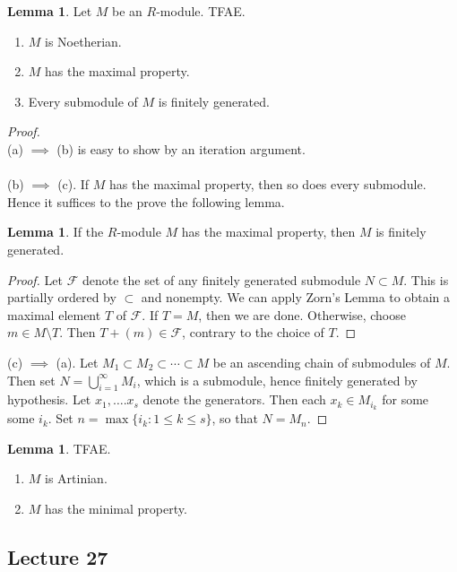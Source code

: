 \documentclass[10pt,letterpaper,cm]{nupset}
\theoremstyle{definition}
\theoremstyle{theorem}
\newtheorem{lemma}[definition]{Lemma}
\theoremstyle{remark}
\newcommand{\1}{\mathbf{1}}
\newcommand{\0}{\vec 0}
\begin{document}
\begin{lemma} Let $M$ be an $R$-module. TFAE.
\begin{enumerate}[label=(\alph*)]
\item $M$ is Noetherian.
\item $M$ has the maximal property. 
\item Every submodule of $M$ is finitely generated. 
\end{enumerate}
\end{lemma}
\begin{proof} $ $ \\
(a) $\implies$ (b) is easy to show by an iteration argument.
\\ \\ (b) $\implies$ (c). If $M$ has the maximal property, then so does every submodule. Hence it suffices to the prove the following lemma.
\begin{lemma}\label{l19}
If the $R$-module $M$ has the maximal property, then $M$ is finitely generated.
\end{lemma}
\begin{proof}
Let $\mathcal{F}$ denote the set of any finitely generated submodule $N\subset M$. This is partially ordered by $\subset$ and nonempty. We can apply Zorn's Lemma to obtain a maximal element $T$ of $\mathcal{F}$. If $T=M$, then we are done. Otherwise, choose $m\in M \setminus T$. Then $T + (m) \in \mathcal{F}$, contrary to the choice of $T$. 
\end{proof}
(c) $\implies$ (a). Let $M_1 \subset M_2 \subset \cdots \subset M$ be an ascending chain of submodules of $M$. Then set $N= \bigcup_{i=1}^{\infty} M_i$, which is a submodule, hence finitely generated by hypothesis. Let $x_1, \ldots. x_s$ denote the generators. Then each $x_k \in M_{i_k}$ for some some $i_k$. Set $n= \max\{i_k : 1\leq k \leq s\}$, so that $N = M_n$.
\end{proof}

\begin{lemma} TFAE.
\begin{enumerate}[label=(\alph*)]
\item $M$ is Artinian.
\item $M$ has the minimal property.
\end{enumerate}
\end{lemma}

\subsection{Lecture 27}
\end{document}
